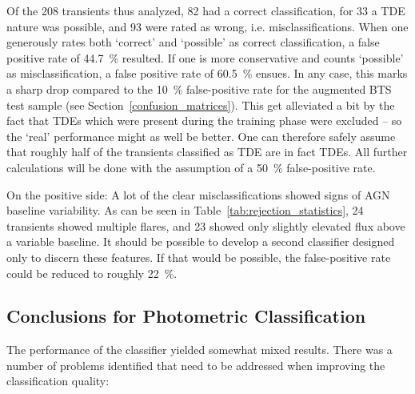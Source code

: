 Of the 208 transients thus analyzed, 82 had a correct classification, for 33 a TDE nature was possible, and 93 were rated as wrong, i.e. misclassifications. When one generously rates both `correct' and `possible' as correct classification, a false positive rate of \SI{44.7}{\percent} resulted. If one is more conservative and counts `possible' as misclassification, a false positive rate of \SI{60.5}{\percent} ensues. In any case, this marks a sharp drop compared to the \SI{10}{\percent} false-positive rate for the augmented BTS test sample (see Section~\ref{confusion_matrices}). This get alleviated a bit by the fact that TDEs which were present during the training phase were excluded -- so the `real' performance might as well be better. One can therefore safely assume that roughly half of the transients classified as TDE are in fact TDEs. All further calculations will be done with the assumption of a \SI{50}{\percent} false-positive rate.

On the positive side: A lot of the clear misclassifications showed signs of AGN baseline variability. As can be seen in Table~\ref{tab:rejection_statistics}, 24 transients showed multiple flares, and 23 showed only slightly elevated flux above a variable baseline. It should be possible to develop a second classifier designed only to discern these features. If that would be possible, the false-positive rate could be reduced to roughly \SI{22}{\percent}.

\subsection{Conclusions for Photometric Classification}
The performance of the classifier yielded somewhat mixed results. There was a number of problems identified that need to be addressed when improving the classification quality:

